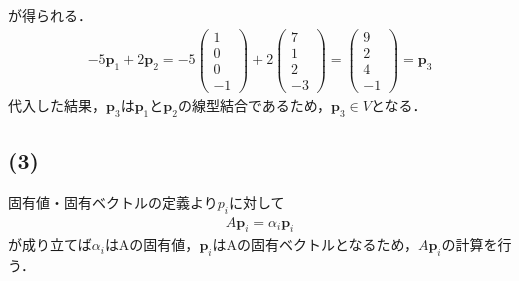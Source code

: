 \documentclass[11pt, titlepage]{jsarticle}
\begin{document}
が得られる．
\begin{eqnarray*}
  -5 \boldsymbol p_1 + 2 \boldsymbol p_2=-5\begin{pmatrix}
    1 \\
    0 \\
    0 \\
    -1
  \end{pmatrix}+2\begin{pmatrix}
    7 \\
    1 \\
    2 \\
    -3
  \end{pmatrix}=\begin{pmatrix}
    9 \\
    2 \\
    4 \\
    -1
  \end{pmatrix}=\boldsymbol p_3
\end{eqnarray*}
代入した結果，$\boldsymbol p_3$は$\boldsymbol p_1$と$\boldsymbol p_2$の線型結合であるため，$\boldsymbol p_3 \in V$となる．

\newpage
\subsection*{(3)}
固有値・固有ベクトルの定義より$p_i$に対して
\begin{eqnarray*}
  A \boldsymbol p_i = \alpha_i \boldsymbol p_i
\end{eqnarray*}
が成り立てば$\alpha_i$はAの固有値，$\boldsymbol p_i$はAの固有ベクトルとなるため，$A \boldsymbol p_i$の計算を行う．
\end{document}
